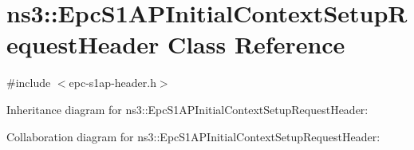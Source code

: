 \hypertarget{classns3_1_1EpcS1APInitialContextSetupRequestHeader}{}\section{ns3\+:\+:Epc\+S1\+A\+P\+Initial\+Context\+Setup\+Request\+Header Class Reference}
\label{classns3_1_1EpcS1APInitialContextSetupRequestHeader}


{\ttfamily \#include $<$epc-\/s1ap-\/header.\+h$>$}



Inheritance diagram for ns3\+:\+:Epc\+S1\+A\+P\+Initial\+Context\+Setup\+Request\+Header\+:


Collaboration diagram for ns3\+:\+:Epc\+S1\+A\+P\+Initial\+Context\+Setup\+Request\+Header\+:
